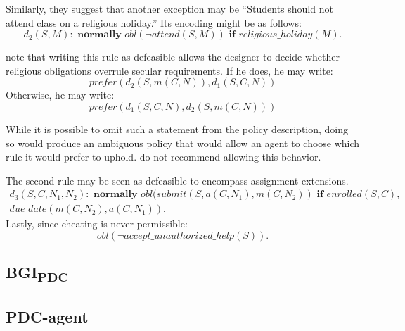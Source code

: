 Similarly, they suggest that another exception may be ``Students should not attend class on a religious holiday.''
Its encoding might be as follows:
\begin{equation}
    d_2(S,M): \textbf{ normally } obl(\neg attend(S, M)) \textbf{ if } religious\_holiday(M).
\end{equation}

\citet{gelfond_authorization_2008} note that writing this rule as defeasible allows the designer to decide whether religious obligations overrule secular requirements.
If he does, he may write:
\begin{equation}
    prefer(d_2(S, m(C,N)),d_1(S,C,N))
\end{equation}
Otherwise, he may write:
\begin{equation}
    prefer(d_1(S,C,N), d_2(S, m(C,N)))
\end{equation}

While it is possible to omit such a statement from the policy description, doing so would produce an ambiguous policy that would allow an agent to choose which rule it would prefer to uphold.
\citet{gelfond_authorization_2008} do not recommend allowing this behavior.

The second rule may be seen as defeasible to encompass assignment extensions.
\begin{multline}
    d_3(S,C,N_1,N_2): \textbf{ normally } obl(submit(S,a(C,N_1),m(C,N_2)) \textbf{ if } enrolled(S,C), \\
        due\_date(m(C,N_2), a(C,N_1)).
\end{multline}
Lastly, since cheating is never permissible:
\begin{equation}
    obl(\neg accept\_unauthorized\_help(S)).
\end{equation}






\subsection{\texorpdfstring{BGI\textsubscript{PDC}}{BGI-PDC}}

\subsection{PDC-agent}
